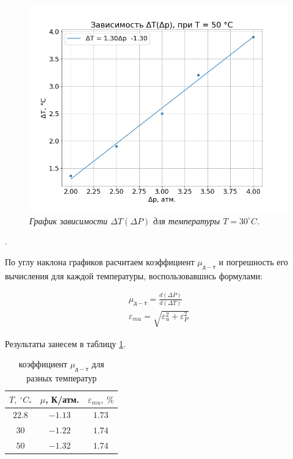 \documentclass[a4paper, 12pt]{article}
\newcounter{Points}
\newcommand{\point}{\arabic{Points}. \addtocounter{Points}{1}}
\begin{document}
\begin{figure}[h]
    \centering
    \includegraphics[width=\linewidth]{plot_dt_from_dp_T_50.png}
    \caption{\textit{График зависимости $\Delta T \left(\Delta P\right)$ для температуры $T = 30 ^\circ C$.}}
    \label{fig:plot_dt_from_dp_T_50}
\end{figure}

\point По углу наклона графиков расчитаем коэффициент  $\mu_{д-т}$ и погрешность его вычисления для каждой температуры, воспользовавшись формулами:

\begin{gather*}
    \mu_{д-т} = \frac{d\left(\Delta P\right)}{d\left(\Delta T\right)} \\
    \varepsilon_{mu} = \sqrt{\varepsilon_u^2 + \varepsilon_{P}^2}
\end{gather*}

Результаты занесем в таблицу \ref{tabl:mus}.

\begin{table}[h]
    \centering
    \begin{tabular}{|c|c|c|}\hline
    $T,~^\circ C$.	& $\mu$, К/атм.	& $\varepsilon_{mu},~\%$	\\ \hline
    $22.8$	& $-1.13$	& $1.73$\\ \hline
    $30$	& $-1.22$	& $1.74$\\ \hline
    $50$	& $-1.32$	& $1.74$\\ \hline
    \end{tabular}
    \caption{коэффициент $\mu_{д-т}$ для разных температур}
    \label{tabl:mus}
\end{table}
\end{document}
